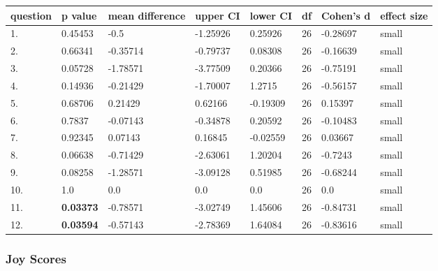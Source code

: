 \documentclass[11pt, twoside, reqno]{book}
\begin{document}
\begin{table}[h!]
    \raggedright
    \begin{tabular}{|l|l|l|l|l|l|l|l|}
    \hline
        question & p value & mean difference & upper CI & lower CI & df & Cohen's d & effect size  \\ \hline
        1. & 0.45453 & -0.5 & -1.25926 & 0.25926 & 26 & -0.28697 & small \\ \hline
        2. & 0.66341 & -0.35714 & -0.79737 & 0.08308 & 26 & -0.16639 & small  \\ \hline
        3. & 0.05728 & -1.78571 & -3.77509 & 0.20366 & 26 & -0.75191 & small  \\ \hline
        4. & 0.14936 & -0.21429 & -1.70007 & 1.2715 & 26 & -0.56157 & small \\ \hline
        5. & 0.68706 & 0.21429 & 0.62166 & -0.19309 & 26 & 0.15397 & small  \\ \hline
        6. & 0.7837 & -0.07143 & -0.34878 & 0.20592 & 26 & -0.10483 & small \\ \hline
        7. & 0.92345 & 0.07143 & 0.16845 & -0.02559 & 26 & 0.03667 & small \\ \hline
        8. & 0.06638 & -0.71429 & -2.63061 & 1.20204 & 26 & -0.7243 & small \\ \hline
        9. & 0.08258 & -1.28571 & -3.09128 & 0.51985 & 26 & -0.68244 & small \\ \hline
        10. & 1.0 & 0.0 & 0.0 & 0.0 & 26 & 0.0 & small  \\ \hline
        11. & \textbf{0.03373} & -0.78571 & -3.02749 & 1.45606 & 26 & -0.84731 & small \\ \hline
        12. & \textbf{0.03594} & -0.57143 & -2.78369 & 1.64084 & 26 & -0.83616 & small \\ \hline
    \end{tabular}
\end{table}

\subsubsection{\textbf{Joy Scores}}
\end{document}
